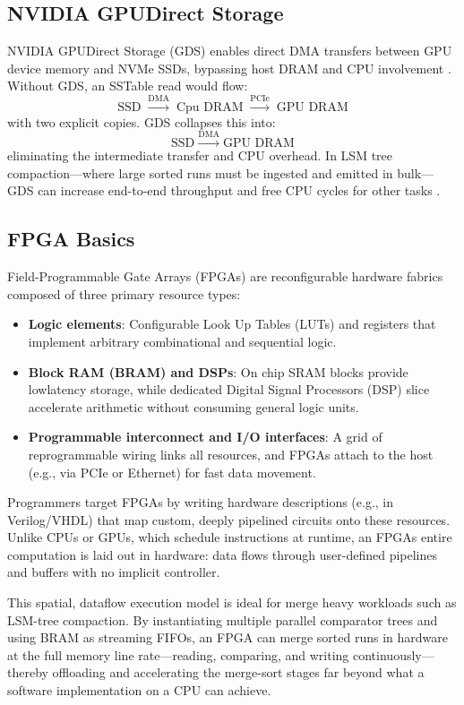 \documentclass[sigconf]{acmart}
\begin{document}
        \subsection{NVIDIA GPUDirect Storage}
        NVIDIA GPUDirect Storage (GDS) enables direct DMA transfers between GPU device memory and NVMe SSDs, bypassing host DRAM and CPU involvement \cite{zhou2024gpuaccel}.  Without GDS, an SSTable read would flow:
        \[
          \text{SSD} \;\xrightarrow{\text{DMA}}\;\text{Cpu DRAM}
          \;\xrightarrow{\text{PCIe}}\;\text{GPU DRAM}
        \]
        with two explicit copies.  GDS collapses this into:
        \[
          \text{SSD} \;\xrightarrow{\text{DMA}}\;\text{GPU DRAM}
        \]
        eliminating the intermediate transfer and CPU overhead.  In LSM tree compaction—where large sorted runs must be ingested and emitted in bulk—GDS can increase end-to-end throughput and free CPU cycles for other tasks \cite{zhou2024gpuaccel}.

      \subsection{FPGA Basics}
        Field-Programmable Gate Arrays (FPGAs) are reconfigurable hardware fabrics composed of three primary resource types:
        \begin{itemize}
          \item \textbf{Logic elements}: Configurable Look Up Tables (LUTs) and registers that implement arbitrary combinational and sequential logic.
          \item \textbf{Block RAM (BRAM) and DSPs}: On chip SRAM blocks provide lowlatency storage, while dedicated Digital Signal Processors (DSP) slice accelerate arithmetic without consuming general logic units.
          \item \textbf{Programmable interconnect and I/O interfaces}: A grid of reprogrammable wiring links all resources, and FPGAs attach to the host (e.g., via PCIe or Ethernet) for fast data movement.
        \end{itemize}
        Programmers target FPGAs by writing hardware descriptions (e.g., in Verilog/VHDL) that map custom, deeply pipelined circuits onto these resources. Unlike CPUs or GPUs, which schedule instructions at runtime, an FPGAs entire computation is laid out in hardware: data flows through user-defined pipelines and buffers with no implicit controller.

        This spatial, dataflow execution model is ideal for merge heavy workloads such as LSM-tree compaction. By instantiating multiple parallel comparator trees and using BRAM as streaming FIFOs, an FPGA can merge sorted runs in hardware at the full memory line rate—reading, comparing, and writing continuously—thereby offloading and accelerating the merge-sort stages far beyond what a software implementation on a CPU can achieve. \cite{Dann24}
\end{document}

